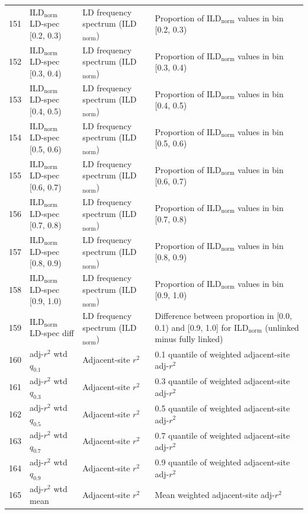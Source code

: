 \begin{longtable}{@{}rllp{7.5cm}@{}}
151 & ILD$_\mathrm{norm}$ LD-spec [0.2, 0.3) & LD frequency spectrum (ILD$_\mathrm{norm}$) & Proportion of ILD$_\mathrm{norm}$ values in bin [0.2, 0.3) \\
152 & ILD$_\mathrm{norm}$ LD-spec [0.3, 0.4) & LD frequency spectrum (ILD$_\mathrm{norm}$) & Proportion of ILD$_\mathrm{norm}$ values in bin [0.3, 0.4) \\
153 & ILD$_\mathrm{norm}$ LD-spec [0.4, 0.5) & LD frequency spectrum (ILD$_\mathrm{norm}$) & Proportion of ILD$_\mathrm{norm}$ values in bin [0.4, 0.5) \\
154 & ILD$_\mathrm{norm}$ LD-spec [0.5, 0.6) & LD frequency spectrum (ILD$_\mathrm{norm}$) & Proportion of ILD$_\mathrm{norm}$ values in bin [0.5, 0.6) \\
155 & ILD$_\mathrm{norm}$ LD-spec [0.6, 0.7) & LD frequency spectrum (ILD$_\mathrm{norm}$) & Proportion of ILD$_\mathrm{norm}$ values in bin [0.6, 0.7) \\
156 & ILD$_\mathrm{norm}$ LD-spec [0.7, 0.8) & LD frequency spectrum (ILD$_\mathrm{norm}$) & Proportion of ILD$_\mathrm{norm}$ values in bin [0.7, 0.8) \\
157 & ILD$_\mathrm{norm}$ LD-spec [0.8, 0.9) & LD frequency spectrum (ILD$_\mathrm{norm}$) & Proportion of ILD$_\mathrm{norm}$ values in bin [0.8, 0.9) \\
158 & ILD$_\mathrm{norm}$ LD-spec [0.9, 1.0) & LD frequency spectrum (ILD$_\mathrm{norm}$) & Proportion of ILD$_\mathrm{norm}$ values in bin [0.9, 1.0) \\
159 & ILD$_\mathrm{norm}$ LD-spec diff & LD frequency spectrum (ILD$_\mathrm{norm}$) & Difference between proportion in [0.0, 0.1) and [0.9, 1.0] for ILD$_\mathrm{norm}$ (unlinked minus fully linked) \\
\midrule
160 & adj-$r^2$ wtd $q_{0.1}$ & Adjacent-site $r^2$ & 0.1 quantile of weighted adjacent-site adj-$r^2$ \\
161 & adj-$r^2$ wtd $q_{0.3}$ & Adjacent-site $r^2$ & 0.3 quantile of weighted adjacent-site adj-$r^2$ \\
162 & adj-$r^2$ wtd $q_{0.5}$ & Adjacent-site $r^2$ & 0.5 quantile of weighted adjacent-site adj-$r^2$ \\
163 & adj-$r^2$ wtd $q_{0.7}$ & Adjacent-site $r^2$ & 0.7 quantile of weighted adjacent-site adj-$r^2$ \\
164 & adj-$r^2$ wtd $q_{0.9}$ & Adjacent-site $r^2$ & 0.9 quantile of weighted adjacent-site adj-$r^2$ \\
165 & adj-$r^2$ wtd mean & Adjacent-site $r^2$ & Mean weighted adjacent-site adj-$r^2$ \\

\end{longtable}
